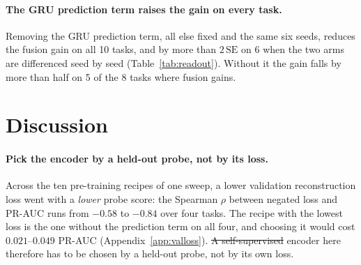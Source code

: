 \documentclass{article}
\makeatletter
\providecommand{\DIFaddtex}[1]{{\protect\color{blue}\uwave{#1}}} %
\providecommand{\DIFdeltex}[1]{{\protect\color{red}\sout{#1}}} %
\providecommand{\DIFaddbegin}{} %
\providecommand{\DIFaddend}{} %
\providecommand{\DIFdelbegin}{} %
\providecommand{\DIFdelend}{} %
\providecommand{\DIFadd}[1]{\texorpdfstring{\DIFaddtex{#1}}{#1}} %
\providecommand{\DIFdel}[1]{\texorpdfstring{\DIFdeltex{#1}}{}} %
\providecommand{\DIFscaledelfig}{0.5}
\newlength{\DIFdelgraphicswidth} %
\newlength{\DIFdelgraphicsheight} %
\providecommand{\DIFaddincludegraphics}[2][]{{\color{blue}\fbox{\DIFOincludegraphics[#1]{#2}}}} %
\providecommand{\DIFdelincludegraphics}[2][]{%
\sbox{\DIFdelgraphicsbox}{\DIFOincludegraphics[#1]{#2}}%
\settoboxwidth{\DIFdelgraphicswidth}{\DIFdelgraphicsbox} %
\settoboxtotalheight{\DIFdelgraphicsheight}{\DIFdelgraphicsbox} %
\scalebox{\DIFscaledelfig}{%
\parbox[b]{\DIFdelgraphicswidth}{\usebox{\DIFdelgraphicsbox}\\[-\baselineskip] \rule{\DIFdelgraphicswidth}{0em}}\llap{\resizebox{\DIFdelgraphicswidth}{\DIFdelgraphicsheight}{%
\setlength{\unitlength}{\DIFdelgraphicswidth}%
\begin{picture}(1,1)%
\thicklines\linethickness{2pt} %
{\color[rgb]{1,0,0}\put(0,0){\framebox(1,1){}}}%
{\color[rgb]{1,0,0}\put(0,0){\line( 1,1){1}}}%
{\color[rgb]{1,0,0}\put(0,1){\line(1,-1){1}}}%
\end{picture}%
}\hspace*{3pt}}} %
} %
\DeclareRobustCommand{\DIFaddbegin}{\DIFOaddbegin \let\includegraphics\DIFaddincludegraphics} %
\DeclareRobustCommand{\DIFaddend}{\DIFOaddend \let\includegraphics\DIFOincludegraphics} %
\DeclareRobustCommand{\DIFdelbegin}{\DIFOdelbegin \let\includegraphics\DIFdelincludegraphics} %
\DeclareRobustCommand{\DIFdelend}{\DIFOaddend \let\includegraphics\DIFOincludegraphics} %
\let\sout@orig\sout %
\renewcommand{\sout}[1]{\ifmmode\text{\sout@orig{\ensuremath{#1}}}\else\sout@orig{#1}\fi} %
\makeatother
\begin{document}
\paragraph{The GRU prediction term raises the gain on every task.} Removing the
GRU prediction term, all else fixed and the same six
seeds, reduces the fusion gain on all 10 tasks, and by more than $2\,\mathrm{SE}$ on 6 when the two
arms are differenced seed by seed (Table~\ref{tab:readout}). Without it the gain falls by more
than half on 5 of the 8 tasks where fusion gains.

\section{Discussion}

\paragraph{Pick the encoder by a held-out probe, not by its loss.} Across the ten pre-training recipes of
one sweep, a lower validation reconstruction loss went with a \emph{lower} probe score: the Spearman
$\rho$ between negated loss and PR-AUC runs from $-0.58$ to $-0.84$ over four tasks. The recipe with the
lowest loss is the one without the prediction term on all four, and choosing it would cost
$0.021$--$0.049$ PR-AUC (Appendix~\ref{app:valloss}). \DIFdelbegin \DIFdel{A self-supervised }\DIFdelend \DIFaddbegin \DIFadd{An }\DIFaddend encoder here therefore has to be
chosen by a held-out probe, not by its own loss.
\end{document}
